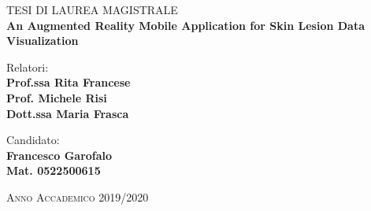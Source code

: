 \vspace{0.2cm}

%
%
\begin{center}
	{\LARGE{TESI DI LAUREA MAGISTRALE}}\\
	\vspace{1cm}
	{\LARGE \textbf{An Augmented Reality Mobile Application for Skin Lesion Data Visualization} \smallskip\\}                                               
\end{center}


\vspace{15mm}
\noindent
%
\begin{minipage}[t]{0.47\textwidth}
	{\large{ Relatori:\\\bf Prof.ssa Rita Francese}}\\
	{\large{ \bf Prof. Michele Risi}}\\
	{\large{ \bf Dott.ssa Maria Frasca}}
	
\end{minipage}
\hfill
\begin{minipage}[t]{0.4\textwidth}\raggedleft
	{\large{Candidato: \\ \bf Francesco Garofalo\\ Mat. 0522500615}}
\end{minipage}                                     					              

\vspace{1cm}
\begin{center}
	\textsc{Anno Accademico 2019/2020}
\end{center}

\newpage

